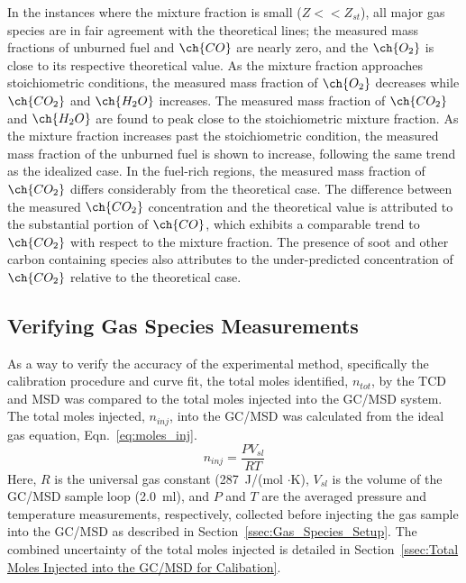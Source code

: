 \documentclass[12pt]{article}
\begin{document}
In the instances where the mixture fraction is small ($Z<<Z_{st}$), all major gas species are in fair agreement with the theoretical lines; the measured mass fractions of unburned fuel and $\ch{CO}$ are nearly zero, and the $\ch{O_2}$ is close to its respective theoretical value. As the mixture fraction approaches stoichiometric conditions, the measured mass fraction of $\ch{O_{2}}$ decreases while $\ch{CO_{2}}$ and $\ch{H_{2}O}$ increases. The measured mass fraction of $\ch{CO_{2}}$ and $\ch{H_{2}O}$ are found to peak close to the stoichiometric mixture fraction. As the mixture fraction increases past the stoichiometric condition, the measured mass fraction of the unburned fuel is shown to increase, following the same trend as the idealized case. In the fuel-rich regions, the measured mass fraction of $\ch{CO_{2}}$ differs considerably from the theoretical case. The difference between the measured $\ch{CO_{2}}$ concentration and the theoretical value is attributed to the substantial portion of $\ch{CO}$, which exhibits a comparable trend to $\ch{CO_{2}}$ with respect to the mixture fraction. The presence of soot and other carbon containing species also attributes to the under-predicted concentration of $\ch{CO_{2}}$ relative to the theoretical case.

\subsection{Verifying Gas Species Measurements}
\label{ssec:Verifying_Vol_Frac_Measurements}
As a way to verify the accuracy of the experimental method, specifically the calibration procedure and curve fit, the total moles identified, $n_{tot}$, by the TCD and MSD was compared to the total moles injected into the GC/MSD system. The total moles injected, $n_{inj}$, into the GC/MSD was calculated from the ideal gas equation, Eqn.~\ref{eq:moles_inj}.
\begin{equation}\label{eq:moles_inj}
n_{inj}=\frac{PV_{sl}}{RT}
\end{equation}
Here, $R$ is the universal gas constant (287~J/(mol $\cdot$K), $V_{sl}$ is the volume of the GC/MSD sample loop (\SI{2.0}{ml}), and $P$ and $T$ are the averaged pressure and temperature measurements, respectively, collected before injecting the gas sample into the GC/MSD as described in Section~\ref{ssec:Gas_Species_Setup}. The combined uncertainty of the total moles injected is detailed in Section~\ref{ssec:Total Moles Injected into the GC/MSD for Calibation}.
\end{document}

